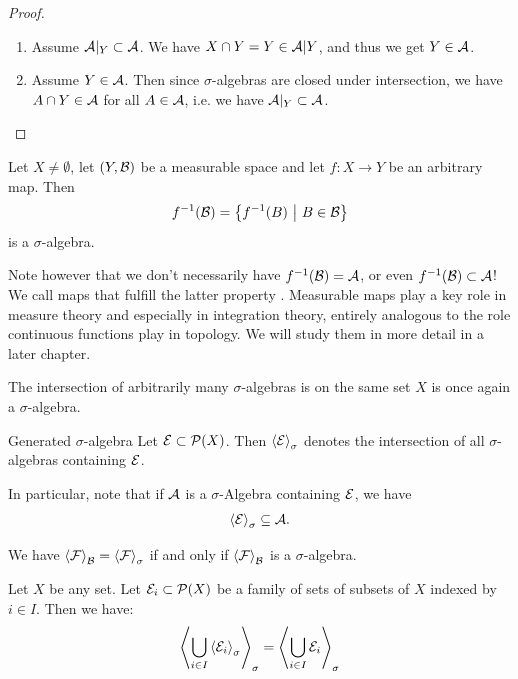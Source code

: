 \begin{proof}
	\phantom{}
	\begin{enumerate}
		\item Assume $\mathcal{A}|_Y \subset \mathcal{A}$. We have $X \cap Y = Y \in \mathcal{A}|Y$, and thus we get $Y \in \mathcal{A}$.
		\item Assume $Y \in \mathcal{A}$. Then since $\sigma$-algebras are closed under intersection, we have $A \cap Y \in \mathcal{A}$ for all $A \in \mathcal{A}$, i.e. we have $\mathcal{A}|_Y \subset \mathcal{A}$.
	\end{enumerate}
\end{proof}
\begin{theorem}
	Let $X \neq \emptyset$, let $(Y, \mathcal{B})$ be a measurable space and let $f : X \to Y$ be an arbitrary map. Then
	\begin{align*}
		f^{-1}(\mathcal{B}) = \qty{f^{-1}(B) ~\middle|~B \in \mathcal{B}}
	\end{align*}
	is a $\sigma$-algebra.
\end{theorem}
Note however that we don't necessarily have $f^{-1}(\mathcal{B}) = \mathcal{A}$, or even $f^{-1}(\mathcal{B}) \subset \mathcal{A}$! We call maps that fulfill the latter property . Measurable maps play a key role in measure theory and especially in integration theory, entirely analogous to the role continuous functions play in topology. We will study them in more detail in a later chapter.
\begin{theorem}
	The intersection of arbitrarily many $\sigma$-algebras is on the same set $X$ is once again a $\sigma$-algebra.
\end{theorem}
\begin{importantcorollary}{Generated $\sigma$-algebra}{}
	Let $\mathcal{E} \subset \mathcal{P}(X)$. Then $\left\langle \mathcal{E} \right\rangle_\sigma$ denotes the intersection of all $\sigma$-algebras containing $\mathcal{E}$.
\end{importantcorollary}
In particular, note that if $\mathcal{A}$ is a $\sigma$-Algebra containing $\mathcal{E}$, we have
\begin{align*}
	\left\langle \mathcal{E} \right\rangle_\sigma \subseteq \mathcal{A}.
\end{align*}
\begin{theorem}
	We have $\left\langle \mathcal{F} \right\rangle_{\mathcal{B}} = \left\langle \mathcal{F} \right\rangle_\sigma$ if and only if $\left\langle \mathcal{F} \right\rangle_{\mathcal{B}}$ is a $\sigma$-algebra.
\end{theorem}
\begin{theorem}
	Let $X$ be any set. Let $\mathcal{E}_i \subset \mathcal{P}(X)$ be a family of sets of subsets of $X$ indexed by $i \in I$. Then we have:
	\begin{align*}
		\left\langle \bigcup_{i \in I} \left\langle \mathcal{E}_i \right\rangle_\sigma \right\rangle_\sigma = \left\langle \bigcup_{i \in I} \mathcal{E}_i \right\rangle_\sigma
	\end{align*}
\end{theorem}
\clearpage

